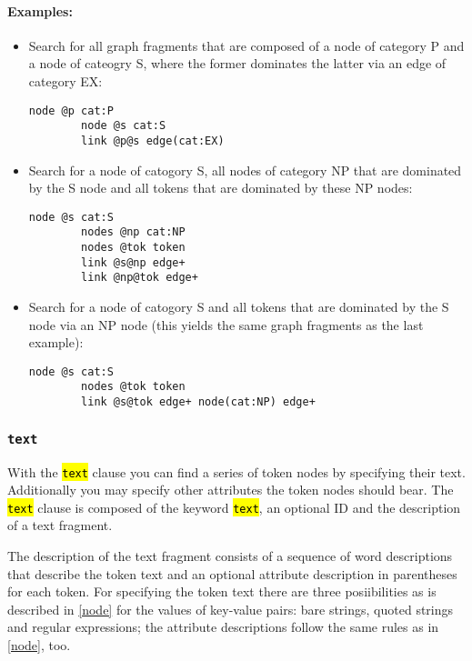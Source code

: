 \documentclass[12pt]{scrartcl}
\newcommand{\code}[1]{\hl{\texttt{#1}}}
\begin{document}
\paragraph*{Examples:}
\begin{itemize}
	\item Search for all graph fragments that are composed of a node of category P and a node of cateogry S, where the former dominates the latter via an edge of category EX:
	\begin{lstlisting}[gobble=8,aboveskip=.6em,belowskip=.2em]
		node @p cat:P
		node @s cat:S
		link @p@s edge(cat:EX)
	\end{lstlisting}
	\item Search for a node of catogory S, all nodes of category NP that are dominated by the S node and all tokens that are dominated by these NP nodes:
	\begin{lstlisting}[gobble=8,aboveskip=.6em,belowskip=.2em]
		node @s cat:S
		nodes @np cat:NP
		nodes @tok token
		link @s@np edge+
		link @np@tok edge+
	\end{lstlisting}
	\item Search for a node of catogory S and all tokens that are dominated by the S node via an NP node (this yields the same graph fragments as the last example):
	\begin{lstlisting}[gobble=8,aboveskip=.6em,belowskip=.2em]
		node @s cat:S
		nodes @tok token
		link @s@tok edge+ node(cat:NP) edge+
	\end{lstlisting}
\end{itemize}



\subsubsection{\texttt{text}}

With the \code{text} clause you can find a series of token nodes by specifying their text.
Additionally you may specify other attributes the token nodes should bear.
The \code{text} clause is composed of the keyword \code{text}, an optional ID and the description of a text fragment.

The description of the text fragment consists of a sequence of word descriptions that describe the token text and an optional attribute description in parentheses for each token.
For specifying the token text there are three posiibilities as is described in \ref{node} for the values of key-value pairs: bare strings, quoted strings and regular expressions; the attribute descriptions follow the same rules as in \ref{node}, too.
\end{document}
